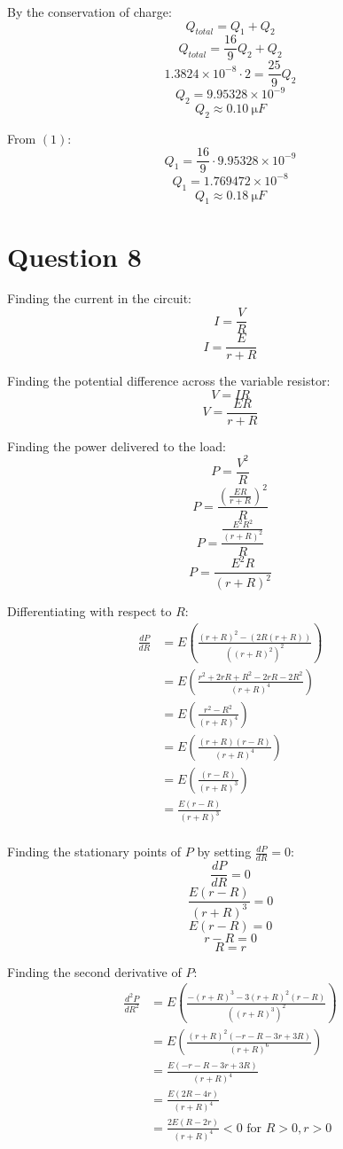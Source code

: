 \documentclass[11pt]{article}
\begin{document}
By the conservation of charge:
\[Q_{total} = Q_1 + Q_2\]
\[Q_{total} = \frac{16}{9} Q_2 + Q_2\]
\[1.3824 \times 10^{-8} \cdot 2  = \frac{25}{9} Q_2\]
\[Q_2 = 9.95328 \times 10^{-9}\]
\[Q_2 \approx \qty{0.10}{\unit{\micro F}}\]

From \((1)\):
\[Q_1 = \frac{16}{9} \cdot 9.95328 \times 10^{-9}\]
\[Q_1 = 1.769472 \times 10^{-8}\]
\[Q_1 \approx \qty{0.18}{\unit{\micro F}}\]


\section{Question 8}
\label{sec:org0eb4ee3}
Finding the current in the circuit:
\[I = \frac{V}{R}\]
\[I = \frac{E}{r + R}\]

Finding the potential difference across the variable resistor:
\[V = IR\]
\[V = \frac{ER}{r + R}\]

Finding the power delivered to the load:
\[P = \frac{V^2}{R}\]
\[P = \frac{\left( \frac{ER}{r + R}\right)^2}{R}\]
\[P = \frac{\frac{E^2 R^2}{(r + R)^2}}{R}\]
\[P = \frac{E^2 R}{(r + R)^2}\]

Differentiating with respect to \(R\):
\begin{align*}
\frac{dP}{dR} &= E \left( \frac{(r + R)^2 - (2R(r + R))}{((r + R)^2)^2} \right) \\
&= E \left( \frac{r^2 + 2rR + R^2 - 2rR - 2R^2}{(r + R)^4} \right) \\
&= E \left( \frac{r^2 - R^2}{(r + R)^4} \right) \\
&= E \left( \frac{(r + R)(r - R)}{(r + R)^4} \right) \\
&= E \left( \frac{(r - R)}{(r + R)^3} \right) \\
&= \frac{E(r - R)}{(r + R)^3} \\
\end{align*}

Finding the stationary points of \(P\) by setting \(\frac{dP}{dR} = 0\):
\[\frac{dP}{dR} = 0\]
\[\frac{E(r - R)}{(r + R)^3} = 0\]
\[E(r - R) = 0\]
\[r - R = 0\]
\[R = r\]

Finding the second derivative of \(P\):
\begin{align*}
\frac{d^2P}{dR^2} &= E \left( \frac{-(r + R)^3 - 3(r + R)^2 (r - R)}{((r + R)^3)^2} \right) \\
&= E \left( \frac{(r + R)^2 (- r - R - 3r + 3R)}{(r + R)^6} \right) \\
&= \frac{E(- r - R - 3r + 3R)}{(r + R)^4} \\
&= \frac{E(2R - 4r)}{(r + R)^4} \\
&= \frac{2E(R - 2r)}{(r + R)^4} < 0 \text{ for } R > 0, r > 0\\
\end{align*}
\end{document}

